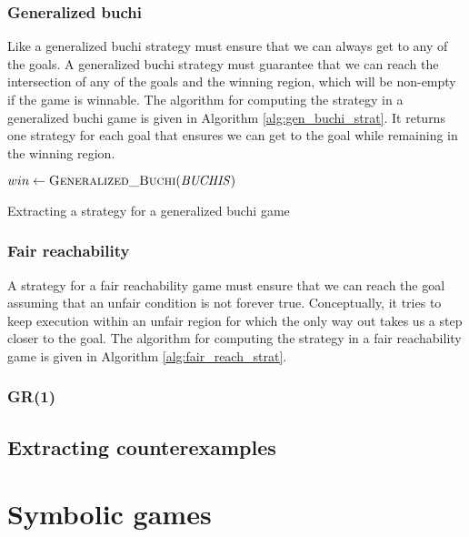 \subsubsection{Generalized buchi}

Like a generalized buchi strategy must ensure that we can always get to any of the goals. A generalized buchi strategy must guarantee that we can reach the intersection of any of the goals and the winning region, which will be non-empty if the game is winnable. The algorithm for computing the strategy in a generalized buchi game is given in Algorithm \ref{alg:gen_buchi_strat}. It returns one strategy for each goal that ensures we can get to the goal while remaining in the winning region. 

\begin{algorithm}[t]
\begin{algorithmic}
\State $win \gets \Call{Generalized\_Buchi}{\genbuchiobj}$

\State \Return {}
\EndFor

\EndFunction
\end{algorithmic}
\caption{Extracting a strategy for a generalized buchi game}
\label{alg:gen_buchi_strat}
\end{algorithm}

\subsubsection{Fair reachability}

A strategy for a fair reachability game must ensure that we can reach the goal assuming that an unfair condition is not forever true. Conceptually, it tries to keep execution within an unfair region for which the only way out takes us a step closer to the goal. The algorithm for computing the strategy in a fair reachability game is given in Algorithm \ref{alg:fair_reach_strat}.

\subsubsection{GR(1)}

\subsection{Extracting counterexamples}

\section{Symbolic games}

